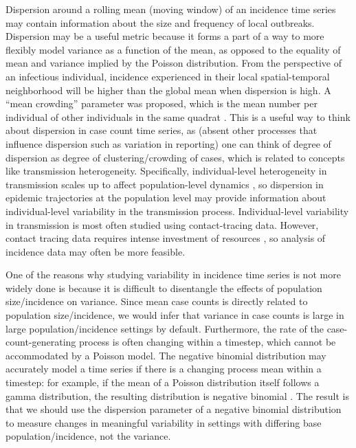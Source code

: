 \documentclass[10pt,letterpaper]{article}
\begin{document}
Dispersion around a rolling mean (moving window) of an incidence time series may contain information about the size and frequency of local outbreaks. 
Dispersion may be a useful metric because it forms a part of a way to more flexibly model variance as a function of the mean, as opposed to the equality of mean and variance implied by the Poisson distribution. 
From the perspective of an infectious individual, incidence experienced in their local spatial-temporal neighborhood will be higher than the global mean when dispersion is high. 
A ``mean crowding'' parameter was proposed, which is the mean number per individual of other individuals in the same quadrat \cite{lloyd_mean_1967}. 
This is a useful way to think about dispersion in case count time series, as (absent other processes that influence dispersion such as variation in reporting) one can think of degree of dispersion as degree of clustering/crowding of cases, which is related to concepts like transmission heterogeneity. 
Specifically, individual-level heterogeneity in transmission scales up to affect population-level dynamics \cite{lloyd-smith_superspreading_2005}, so dispersion in epidemic trajectories at the population level may provide information about individual-level variability in the transmission process. 
Individual-level variability in transmission is most often studied using contact-tracing data. 
However, contact tracing data requires intense investment of resources \cite{kretzschmar_impact_2020}, so analysis of incidence data may often be more feasible. 

One of the reasons why studying variability in incidence time series is not more widely done is because it is difficult to disentangle the effects of population size/incidence on variance. 
Since mean case counts is directly related to population size/incidence, we would infer that variance in case counts is large in large population/incidence settings by default. 
Furthermore, the rate of the case-count-generating process is often changing within a timestep, which cannot be accommodated by a Poisson model. 
The negative binomial distribution may accurately model a time series if there is a changing process mean within a timestep: for example, if the mean of a Poisson distribution itself follows a gamma distribution, the resulting distribution is negative binomial \cite{cook_notes_nodate}. 
The result is that we should use the dispersion parameter of a negative binomial distribution to measure changes in meaningful variability in settings with differing base population/incidence, not the variance. 
\end{document}
